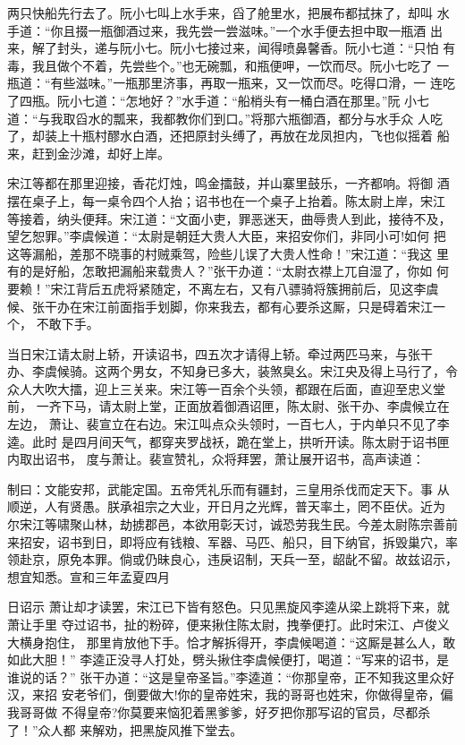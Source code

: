 两只快船先行去了。阮小七叫上水手来，舀了舱里水，把展布都拭抹了，却叫
水手道：“你且掇一瓶御酒过来，我先尝一尝滋味。”一个水手便去担中取一瓶酒
出来，解了封头，递与阮小七。阮小七接过来，闻得喷鼻馨香。阮小七道：“只怕
有毒，我且做个不着，先尝些个。”也无碗瓢，和瓶便呷，一饮而尽。阮小七吃了
一瓶道：“有些滋味。”一瓶那里济事，再取一瓶来，又一饮而尽。吃得口滑，一
连吃了四瓶。阮小七道：“怎地好？”水手道：“船梢头有一桶白酒在那里。”阮
小七道：“与我取舀水的瓢来，我都教你们到口。”将那六瓶御酒，都分与水手众
人吃了，却装上十瓶村醪水白酒，还把原封头缚了，再放在龙凤担内，飞也似摇着
船来，赶到金沙滩，却好上岸。

宋江等都在那里迎接，香花灯烛，鸣金擂鼓，并山寨里鼓乐，一齐都响。将御
酒摆在桌子上，每一桌令四个人抬；诏书也在一个桌子上抬着。陈太尉上岸，宋江
等接着，纳头便拜。宋江道：“文面小吏，罪恶迷天，曲辱贵人到此，接待不及，
望乞恕罪。”李虞候道：“太尉是朝廷大贵人大臣，来招安你们，非同小可!如何
把这等漏船，差那不晓事的村贼乘驾，险些儿误了大贵人性命！”宋江道：“我这
里有的是好船，怎敢把漏船来载贵人？”张干办道：“太尉衣襟上兀自湿了，你如
何要赖！”宋江背后五虎将紧随定，不离左右，又有八骠骑将簇拥前后，见这李虞
候、张干办在宋江前面指手划脚，你来我去，都有心要杀这厮，只是碍着宋江一个，
不敢下手。

当日宋江请太尉上轿，开读诏书，四五次才请得上轿。牵过两匹马来，与张干
办、李虞候骑。这两个男女，不知身已多大，装煞臭幺。宋江央及得上马行了，令
众人大吹大擂，迎上三关来。宋江等一百余个头领，都跟在后面，直迎至忠义堂前，
一齐下马，请太尉上堂，正面放着御酒诏匣，陈太尉、张干办、李虞候立在左边，
萧让、裴宣立在右边。宋江叫点众头领时，一百七人，于内单只不见了李逵。此时
是四月间天气，都穿夹罗战袄，跪在堂上，拱听开读。陈太尉于诏书匣内取出诏书，
度与萧让。裴宣赞礼，众将拜罢，萧让展开诏书，高声读道：

制曰：文能安邦，武能定国。五帝凭礼乐而有疆封，三皇用杀伐而定天下。事
从顺逆，人有贤愚。朕承祖宗之大业，开日月之光辉，普天率土，罔不臣伏。近为
尔宋江等啸聚山林，劫掳郡邑，本欲用彰天讨，诚恐劳我生民。今差太尉陈宗善前
来招安，诏书到日，即将应有钱粮、军器、马匹、船只，目下纳官，拆毁巢穴，率
领赴京，原免本罪。倘或仍昧良心，违戾诏制，天兵一至，龆龀不留。故兹诏示，
想宜知悉。宣和三年孟夏四月

日诏示
萧让却才读罢，宋江已下皆有怒色。只见黑旋风李逵从梁上跳将下来，就萧让手里
夺过诏书，扯的粉碎，便来揪住陈太尉，拽拳便打。此时宋江、卢俊义大横身抱住，
那里肯放他下手。恰才解拆得开，李虞候喝道：“这厮是甚么人，敢如此大胆！”
李逵正没寻人打处，劈头揪住李虞候便打，喝道：“写来的诏书，是谁说的话？”
张干办道：“这是皇帝圣旨。”李逵道：“你那皇帝，正不知我这里众好汉，来招
安老爷们，倒要做大!你的皇帝姓宋，我的哥哥也姓宋，你做得皇帝，偏我哥哥做
不得皇帝?你莫要来恼犯着黑爹爹，好歹把你那写诏的官员，尽都杀了！”众人都
来解劝，把黑旋风推下堂去。

